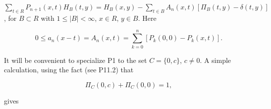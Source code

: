 $\sum_{t \in R} P_{n+1}(x,t) H_B(t,y) = H_B(x,y) - \sum_{t \in B} A_n(x,t) [\Pi_B(t,y) - \delta(t,y)]$, for $B \subset R$ with $1 \leq |B| < \infty$, $x \in R$, $y \in B$. Here

$$0 \leq a_n(x-t) = A_n(x,t) = \sum_{k=0}^{n} [P_k(0,0) - P_k(x,t)].$$

It will be convenient to specialize P1 to the set $C = \{0,c\}$, $c \neq 0$. A simple calculation, using the fact (see P11.2) that

$$\Pi_C(0,c) + \Pi_C(0,0) = 1,$$

gives